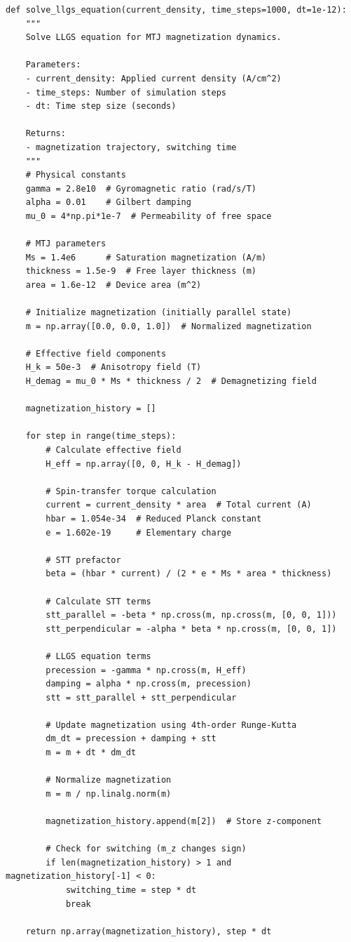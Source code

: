 \documentclass[conference]{IEEEtran}
\begin{document}
\begin{lstlisting}[caption={LLGS equation numerical solver implementation}]
def solve_llgs_equation(current_density, time_steps=1000, dt=1e-12):
    """
    Solve LLGS equation for MTJ magnetization dynamics.
    
    Parameters:
    - current_density: Applied current density (A/cm^2)
    - time_steps: Number of simulation steps  
    - dt: Time step size (seconds)
    
    Returns:
    - magnetization trajectory, switching time
    """
    # Physical constants
    gamma = 2.8e10  # Gyromagnetic ratio (rad/s/T)
    alpha = 0.01    # Gilbert damping
    mu_0 = 4*np.pi*1e-7  # Permeability of free space
    
    # MTJ parameters
    Ms = 1.4e6      # Saturation magnetization (A/m)
    thickness = 1.5e-9  # Free layer thickness (m)
    area = 1.6e-12  # Device area (m^2)
    
    # Initialize magnetization (initially parallel state)
    m = np.array([0.0, 0.0, 1.0])  # Normalized magnetization
    
    # Effective field components
    H_k = 50e-3  # Anisotropy field (T)
    H_demag = mu_0 * Ms * thickness / 2  # Demagnetizing field
    
    magnetization_history = []
    
    for step in range(time_steps):
        # Calculate effective field
        H_eff = np.array([0, 0, H_k - H_demag])
        
        # Spin-transfer torque calculation
        current = current_density * area  # Total current (A)
        hbar = 1.054e-34  # Reduced Planck constant
        e = 1.602e-19     # Elementary charge
        
        # STT prefactor
        beta = (hbar * current) / (2 * e * Ms * area * thickness)
        
        # Calculate STT terms
        stt_parallel = -beta * np.cross(m, np.cross(m, [0, 0, 1]))
        stt_perpendicular = -alpha * beta * np.cross(m, [0, 0, 1])
        
        # LLGS equation terms
        precession = -gamma * np.cross(m, H_eff)
        damping = alpha * np.cross(m, precession)
        stt = stt_parallel + stt_perpendicular
        
        # Update magnetization using 4th-order Runge-Kutta
        dm_dt = precession + damping + stt
        m = m + dt * dm_dt
        
        # Normalize magnetization
        m = m / np.linalg.norm(m)
        
        magnetization_history.append(m[2])  # Store z-component
        
        # Check for switching (m_z changes sign)
        if len(magnetization_history) > 1 and magnetization_history[-1] < 0:
            switching_time = step * dt
            break
    
    return np.array(magnetization_history), step * dt
\end{lstlisting}
\end{document}
